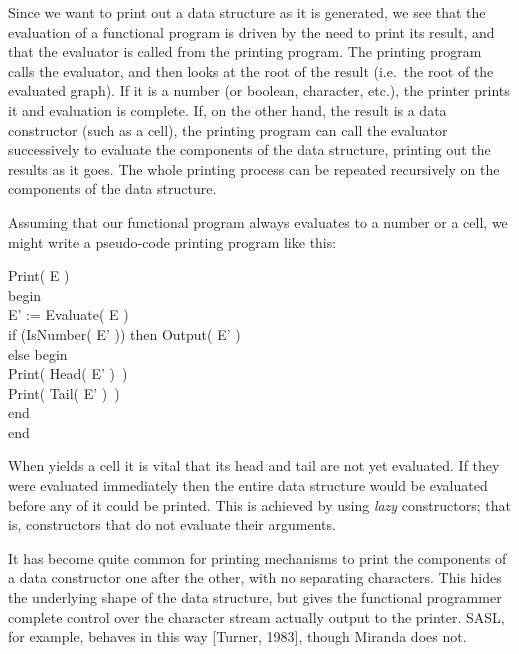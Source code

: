 Since we want to print out a data structure as it is generated, we see that the
evaluation of a functional program is driven by the need to print its result, and
that the evaluator is called from the printing program. The printing program
calls the evaluator, and then looks at the root of the result (i.e.\ the root of the
evaluated graph). If it is a number (or boolean, character, etc.), the printer
prints it and evaluation is complete. If, on the other hand, the result is a data
constructor (such as a  cell), the printing program can call the evaluator
successively to evaluate the components of the data structure, printing out the
results as it goes. The whole printing process can be repeated recursively on
the components of the data structure.

Assuming that our functional program always evaluates to a number or a
 cell, we might write a pseudo-code printing program like this:
\begin{mlcoded}
    Print( E ) \\
    begin \\
    \vs
    \hspace*{1cm} E' := Evaluate( E ) \\
    \hspace*{1cm} if (IsNumber( E' )) then Output( E' ) \\
    \hspace*{1cm} else begin \\
    \hspace*{2cm} Print( Head( E' )\ ) \\
    \hspace*{2cm} Print( Tail( E' )\ ) \\
    \hspace*{1cm} end \\
    end
\end{mlcoded}

When  yields a  cell it is vital that its head and tail are not
yet evaluated. If they were evaluated immediately then the entire data
structure would be evaluated before any of it could be printed. This is
achieved by using \textit{lazy} constructors; that is, constructors that do not evaluate
their arguments.

It has become quite common for printing mechanisms to print the
components of a data constructor one after the other, with no separating
characters. This hides the underlying shape of the data structure, but gives the
functional programmer complete control over the character stream actually
output to the printer. SASL, for example, behaves in this way [Turner, 1983],
though Miranda does not.

